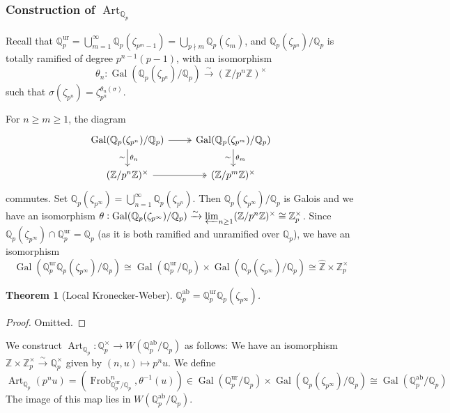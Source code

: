 \documentclass[11pt]{article}
\theoremstyle{definition}
\theoremstyle{plain}
\newtheorem{theorem}[definition]{Theorem}
\theoremstyle{remark}
\DeclareMathOperator{\Gal}{Gal}
\DeclareMathOperator{\Frob}{Frob}
\DeclareMathOperator{\Art}{Art}
\newcommand{\ZZ}{\mathbb{Z}}
\newcommand{\QQ}{\mathbb{Q}}
\newcommand{\ab}{\mathrm{ab}}
\newcommand{\ur}{\mathrm{ur}}
\begin{document}
\subsubsection*{Construction of $\Art_{\QQ_p}$}

Recall that $\QQ_p^\ur = \bigcup_{m=1}^\infty \QQ_p(\zeta_{p^m-1}) = \bigcup_{p \nmid m} \QQ_p(\zeta_m)$, and $\QQ_p(\zeta_{p^n})/\QQ_p$ is totally ramified of degree $p^{n-1}(p-1)$, with an isomorphism
\begin{equation*}
    \theta_n : \Gal(\QQ_p(\zeta_{p^n}) / \QQ_p) \xrightarrow{\sim} (\ZZ / p^n \ZZ)^\times
\end{equation*}
such that $\sigma(\zeta_{p^n}) = \zeta_{p^n}^{\theta_n(\sigma)}$.

For $n \ge m \ge 1$, the diagram
\begin{equation*}
\begin{tikzcd}
    \Gal(\QQ_p(\zeta_{p^n})/\QQ_p) \arrow[r, twoheadrightarrow] \arrow[d, "\theta_n", "\sim"'] & \Gal(\QQ_p(\zeta_{p^m})/\QQ_p) \arrow[d, "\theta_m", "\sim"']\\
    (\ZZ/p^n \ZZ)^\times \arrow[r, twoheadrightarrow] & (\ZZ/p^m \ZZ)^\times
\end{tikzcd}
\end{equation*}
commutes. Set $\QQ_p(\zeta_{p^\infty}) = \bigcup_{n=1}^\infty \QQ_p(\zeta_{p^n})$. Then $\QQ_p(\zeta_{p^\infty}) / \QQ_p$ is Galois and we have an isomorphism $\theta : \Gal(\QQ_p(\zeta_{p^\infty})/\QQ_p) \xrightarrow{\sim} \varprojlim_{n \ge 1} (\ZZ / p^n \ZZ)^\times \cong \ZZ_p^\times$. Since $\QQ_p(\zeta_{p^\infty}) \cap \QQ_p^\ur = \QQ_p$ (as it is both ramified and unramified over $\QQ_p$), we have an isomorphism
\begin{equation*}
    \Gal(\QQ_p^\ur \QQ_p(\zeta_{p^\infty}) / \QQ_p) \cong \Gal(\QQ_p^\ur / \QQ_p) \times \Gal(\QQ_p(\zeta_{p^\infty}) / \QQ_p) \cong \widehat{\ZZ} \times \ZZ_p^\times
\end{equation*}

\begin{theorem}[Local Kronecker-Weber]\label{thm:17_4}
    $\QQ_p^\ab = \QQ_p^\ur \QQ_p(\zeta_{p^\infty})$.
\end{theorem}
\begin{proof}
    Omitted.
\end{proof}

\noindent We construct $\Art_{\QQ_p} : \QQ_p^\times \to W(\QQ_p^\ab / \QQ_p)$ as follows: We have an isomorphism $\ZZ \times \ZZ_p^\times \xrightarrow{\sim} \QQ_p^\times$ given by $(n, u) \mapsto p^n u$. We define
\begin{equation*}
    \Art_{\QQ_p}(p^n u) = (\Frob_{\QQ_p^\ur/\QQ_p}^n, \theta^{-1}(u)) \in \Gal(\QQ_p^\ur / \QQ_p) \times \Gal(\QQ_p(\zeta_{p^\infty}) / \QQ_p) \cong \Gal(\QQ_p^\ab / \QQ_p)
\end{equation*}
The image of this map lies in $W(\QQ_p^\ab / \QQ_p)$.
\end{document}
